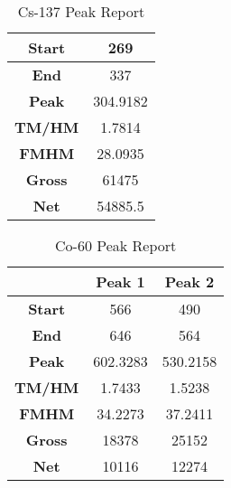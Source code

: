 \begin{table}[H]
    \centering
    \begin{tabular}{|c|c|}
        \hline
        \textbf{Start}           & 269      \\ \hline
        \textbf{End}             & 337      \\ \hline
        \textbf{Peak}            & 304.9182 \\ \hline
        \textbf{TM/HM}           & 1.7814   \\ \hline
        \textbf{FMHM}           & 28.0935   \\ \hline
        \textbf{Gross}           & 61475    \\ \hline
        \textbf{Net}             & 54885.5  \\ \hline
    \end{tabular}
    \caption{Cs-137 Peak Report}
    \label{tab:mca1}
\end{table}

\begin{table}[H]
    \centering
    \begin{tabular}{|c|c|c|}
        \hline
        & Peak 1    &   Peak 2 \\ \hline
        \textbf{Start}           & 566    &  490\\ \hline
        \textbf{End}             & 646  & 564   \\ \hline
        \textbf{Peak}            & 602.3283 & 530.2158 \\ \hline
        \textbf{TM/HM}           & 1.7433 & 1.5238  \\ \hline
        \textbf{FMHM}           & 34.2273 & 37.2411   \\ \hline
        \textbf{Gross}           & 18378 & 25152   \\ \hline
        \textbf{Net}             & 10116 & 12274  \\ \hline
    \end{tabular}
    \caption{Co-60 Peak Report}
    \label{tab:mca2}
\end{table}